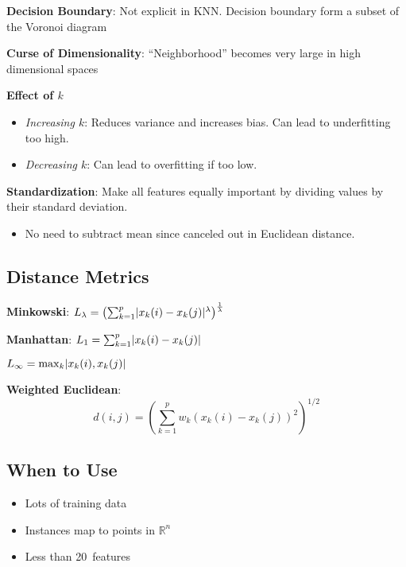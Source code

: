 \documentclass[10pt]{article}
\DeclarePairedDelimiter{\abs}{\lvert}{\rvert}
\begin{document}
\begin{multicols}{3}
  \textbf{Decision Boundary}: Not explicit in KNN\@. Decision boundary form a subset of the Voronoi diagram

  \textbf{Curse of Dimensionality}: ``Neighborhood'' becomes very large in high dimensional spaces

  \textbf{Effect of $k$}
  \begin{itemize}
    \item \textit{Increasing $k$}: Reduces variance and increases bias. Can lead to underfitting too high.
    \item \textit{Decreasing $k$}: Can lead to overfitting if too low.
  \end{itemize}

  \textbf{Standardization}: Make all features equally important by dividing values by their standard deviation.
  \begin{itemize}
    \item No need to subtract mean since canceled out in Euclidean distance.
  \end{itemize}

  \subsection*{Distance Metrics}
  \textbf{Minkowski}: $L_{\lambda} = \left( \sum_{k=1}^{p} \abs{x_k(i) - x_k(j)}^{\lambda}\right)^{\frac{1}{\lambda}}$

  \vspace{8pt}\textbf{Manhattan}: $L_1 = \sum_{k=1}^{p} \abs{x_k(i) - x_k(j)}$

  \vspace{8pt}$L_{\infty} = \max_{k}\abs{x_k(i),x_k(j)}$

  \vspace{8pt}\textbf{Weighted Euclidean}:
  \vspace{-4pt}
  \[ d(i,j) = \left( \sum_{k=1}^{p} w_k \left(x_k(i) - x_k(j)\right)^{2} \right)^{1/2} \]

  \subsection*{When to Use}
  \begin{itemize}
    \item Lots of training data
    \item Instances map to points in $\mathbb{R}^n$
    \item Less than 20~features
  \end{itemize}


\end{multicols}
\end{document}
